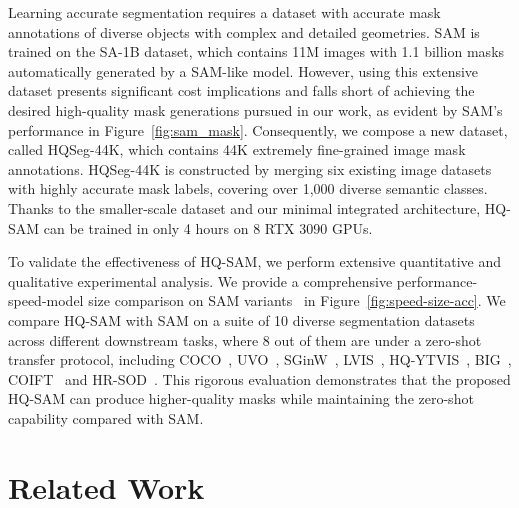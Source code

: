 Learning accurate segmentation requires a dataset with accurate mask annotations of diverse objects with complex and detailed geometries. SAM is trained on the SA-1B dataset, which contains 11M images with 1.1 billion masks automatically generated by a SAM-like model. However, using this extensive dataset presents significant cost implications and falls short of achieving the desired high-quality mask generations pursued in our work, as evident by SAM's performance in Figure~\ref{fig:sam_mask}.
Consequently, we compose a new dataset, called HQSeg-44K, which contains 44K extremely fine-grained image mask annotations. HQSeg-44K is constructed by merging six existing image datasets~\cite{qin2022,liew2021deep,li2020fss,shi2015hierarchical,cheng2014global,yang2013saliency} with highly accurate mask labels, covering over 1,000 diverse semantic classes. Thanks to the smaller-scale dataset and our minimal integrated architecture, HQ-SAM can be trained in only 4 hours on 8 RTX 3090 GPUs.

To validate the effectiveness of HQ-SAM, we perform extensive quantitative and qualitative experimental analysis. We provide a comprehensive performance-speed-model size comparison on SAM variants~\cite{sam,mobile_sam} in Figure~\ref{fig:speed-size-acc}.
We compare HQ-SAM with SAM on a suite of 10 diverse segmentation datasets across different downstream tasks, where 8 out of them are under a zero-shot transfer protocol, including COCO~\cite{lin2014microsoft}, UVO~\cite{uvo}, SGinW~\cite{zou2023generalized}, LVIS~\cite{gupta2019lvis}, HQ-YTVIS~\cite{vmt}, BIG~\cite{cascadepsp}, COIFT~\cite{liew2021deep} and HR-SOD~\cite{zeng2019towards}.  This rigorous evaluation demonstrates that the proposed HQ-SAM can produce higher-quality masks while maintaining the zero-shot capability compared with SAM.

\section{Related Work}

